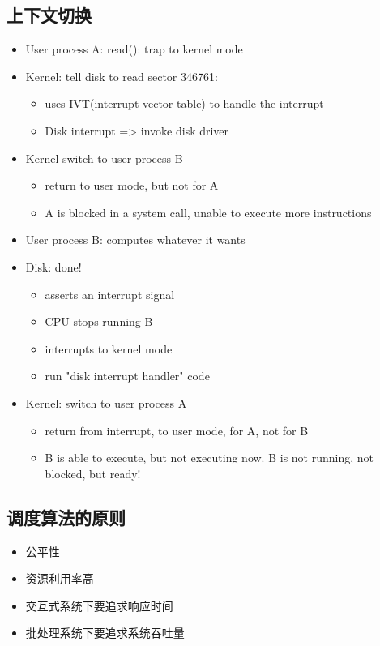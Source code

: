 \documentclass[a4paper, UTF8]{article}
\begin{document}
\subsection{上下文切换}
\begin{itemize}
\item User process A: read(): trap to kernel mode
\item Kernel: tell disk to read sector 346761: 
	\begin{itemize}
	\item uses IVT(interrupt vector table) to handle the interrupt
	\item Disk interrupt => invoke disk driver
	\end{itemize}
\item Kernel switch to user process B
	\begin{itemize}
	\item return to user mode, but not for A
	\item A is blocked in a system call, unable to execute more instructions
	\end{itemize}
\item User process B: computes whatever it wants
\item Disk: done!
	\begin{itemize}
	\item asserts an interrupt signal
	\item CPU stops running B
	\item interrupts to kernel mode
	\item run "disk interrupt handler" code
	\end{itemize}
\item Kernel: switch to user process A
	\begin{itemize}
	\item return from interrupt, to user mode, for A, not for B
	\item B is able to execute, but not executing now. B is not running, not blocked, but ready!
	\end{itemize}
\end{itemize}

\subsection{调度算法的原则}
\begin{itemize}
\item 公平性
\item 资源利用率高
\item 交互式系统下要追求响应时间
\item 批处理系统下要追求系统吞吐量
\end{itemize}
\end{document}
